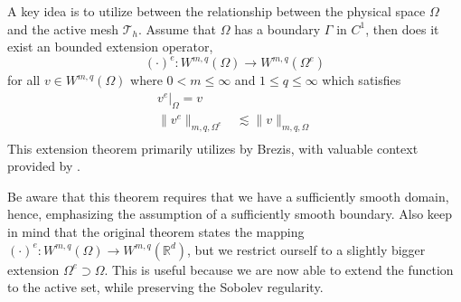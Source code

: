 A key idea is to utilize between the relationship between the physical space $\Omega $ and the active mesh $\mathcal{T}_{h}$. Assume that $\Omega $ has a boundary $\Gamma $ in $C^{1}$, then does it exist an bounded extension operator, \[
( \cdot ) ^{e}: W^{m,q}( \Omega )  \to W^{m,q} ( \Omega ^{e})
\]
for all  $v \in W^{m,q}( \Omega )$ where $0< m \le \infty$ and $1 \le q \le \infty$ which satisfies \[
    \begin{split}
 v^{e}| _{\Omega } =   v  \\
\| v^{e} \|_{ m,q,\Omega ^{e}  }^{  } & \lesssim \| v \|_{ m,q, \Omega  }^{  } \\
    \end{split}
\]
This extension theorem primarily utilizes \cite[Theorem 9.7]{brezis2011functional} by Brezis, with valuable context provided by \cite[p.181, p. 185]{stein1970singular}.
\begin{remark}
    Be aware that this theorem requires that we have a sufficiently smooth domain, hence, emphasizing the assumption of a sufficiently smooth boundary. Also keep in mind that the original theorem states the mapping $ ( \cdot ) ^{e}: W^{m,q}(
    \Omega )  \to W^{m,q} ( \mathbb{R} ^{d})$, but we restrict ourself to a slightly bigger extension $\Omega^{e} \supset   \Omega $.
    This is useful because we are now able to extend the function to the active set, while preserving the Sobolev regularity.
\end{remark}

